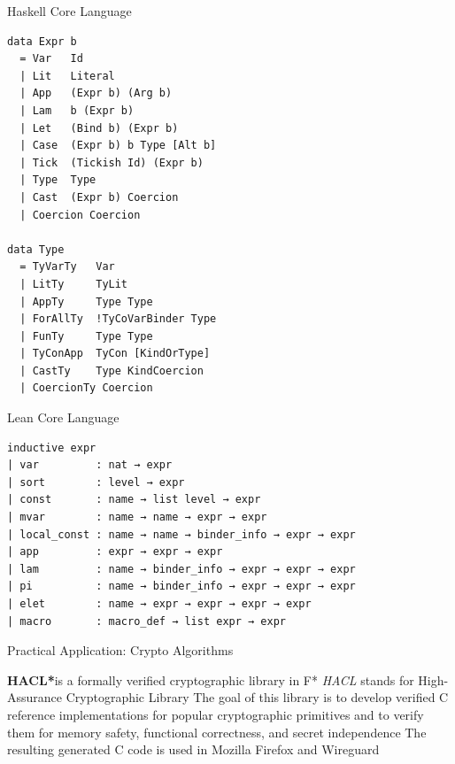 \documentclass[pdf]{beamer}
\begin{document}
\begin{frame}[fragile]{Haskell Core Language}
  \begin{verbatim}
data Expr b
  = Var   Id
  | Lit   Literal
  | App   (Expr b) (Arg b)
  | Lam   b (Expr b)
  | Let   (Bind b) (Expr b)
  | Case  (Expr b) b Type [Alt b]
  | Tick  (Tickish Id) (Expr b)
  | Type  Type
  | Cast  (Expr b) Coercion
  | Coercion Coercion

data Type
  = TyVarTy   Var
  | LitTy     TyLit
  | AppTy     Type Type
  | ForAllTy  !TyCoVarBinder Type
  | FunTy     Type Type
  | TyConApp  TyCon [KindOrType]
  | CastTy    Type KindCoercion
  | CoercionTy Coercion
  \end{verbatim}
\end{frame}

\begin{frame}[fragile]{Lean Core Language}
  \begin{verbatim}
inductive expr
| var         : nat → expr
| sort        : level → expr
| const       : name → list level → expr
| mvar        : name → name → expr → expr
| local_const : name → name → binder_info → expr → expr
| app         : expr → expr → expr
| lam         : name → binder_info → expr → expr → expr
| pi          : name → binder_info → expr → expr → expr
| elet        : name → expr → expr → expr → expr
| macro       : macro_def → list expr → expr
  \end{verbatim}
\end{frame}

\begin{frame}{Practical Application: Crypto Algorithms}
  \begin{outline}
    \1 \textbf{HACL*}\footnotemark[5] is a formally verified cryptographic library in F*
    \1 {\em HACL} stands for High-Assurance Cryptographic Library
    \1 The goal of this library is to develop verified C reference implementations for popular cryptographic primitives and to verify them for memory safety, functional correctness, and secret independence
    \1 The resulting generated C code is used in Mozilla Firefox and Wireguard
  \end{outline}
\end{frame}
\end{document}
